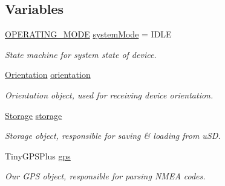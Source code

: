 \subsection*{Variables}
\begin{DoxyCompactItemize}
\item 
\mbox{\label{logging-device_8ino_a13a2ecbcf455940dd240e54e9e39cf7a}} 
\hyperlink{logging-device_8ino_a980e950615d86dadef54f3cfaefb5fb4}{O\+P\+E\+R\+A\+T\+I\+N\+G\+\_\+\+M\+O\+DE} \hyperlink{logging-device_8ino_a13a2ecbcf455940dd240e54e9e39cf7a}{system\+Mode} = I\+D\+LE
\begin{DoxyCompactList}\small\item\em State machine for system state of device. \end{DoxyCompactList}\item 
\mbox{\label{logging-device_8ino_a47be0262307aa023a1bda3d98986a16d}} 
\hyperlink{class_logging_device_1_1_orientation}{Orientation} \hyperlink{logging-device_8ino_a47be0262307aa023a1bda3d98986a16d}{orientation}
\begin{DoxyCompactList}\small\item\em Orientation object, used for receiving device orientation. \end{DoxyCompactList}\item 
\mbox{\label{logging-device_8ino_a40059244119c00baa1b841119cfd1b2e}} 
\hyperlink{class_logging_device_1_1_storage}{Storage} \hyperlink{logging-device_8ino_a40059244119c00baa1b841119cfd1b2e}{storage}
\begin{DoxyCompactList}\small\item\em Storage object, responsible for saving \& loading from u\+SD. \end{DoxyCompactList}\item 
\mbox{\label{logging-device_8ino_a169c53997a7da1d0fb99aec1b4675ce8}} 
Tiny\+G\+P\+S\+Plus \hyperlink{logging-device_8ino_a169c53997a7da1d0fb99aec1b4675ce8}{gps}
\begin{DoxyCompactList}\small\item\em Our G\+PS object, responsible for parsing N\+M\+EA codes. \end{DoxyCompactList}\item 
\mbox{\label{logging-device_8ino_ae3799d2cbf8f13e21cbaef64b75c6833}} 

\end{DoxyCompactItemize}
